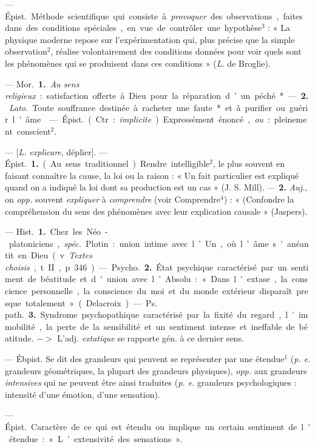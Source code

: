 \begin{itemize}[leftmargin=1cm, label=, itemsep=1pt]
 — \si{Épist.} Méthode
scientifique qui consiste à {\it provoquer}
des observations, faites dans des conditions spéciales, en vue de contrôler
une hypothèse$^3$ : « La physique
moderne repose sur l'expérimentation qui, plus précise que la
simple observation$^2$, réalise volontairement des conditions données
pour voir quels sont les phénomènes
qui se produisent dans ces conditions » ({\it L.} de Broglie).

 — \si{Mor.} {\bf 1.} {\it Au sens religieux} : satisfaction
offerte à Dieu pour la réparation d’un péché*.

— {\bf 2.} {\it Lato.} Toute souffrance destinée à racheter une faute* et à
purifier ou guérir l'âme.

 — \si{Épist.} (Ctr. : {\it implicite}).
Expressément énoncé, {\it ou} : pleinement conscient$^2$.

 — [{\it L.} {\it explicare}, déplier]. —
\si{Épist.} {\bf 1.} (Au sens traditionnel).
Rendre intelligible$^2$, le plus souvent
en faisant connaître la cause, la loi
ou la raison : « Un fait particulier est
expliqué quand on a indiqué la loi
dont sa production est un cas »
(J. S. Mill). — {\bf 2.} {\it Auj.}, on {\it opp.} souvent {\it expliquer}
à {\it comprendre} (voir Comprendre$^4$) : « (Confondre la
compréhension du sens des phénomènes avec leur explication causale »
(Jaspers).

 — \si{Hist.} {\bf 1.} Chez les Néo-platoniciens, {\it spéc.}
Plotin : union intime avec l’Un, où l'âme s'anéantit en
Dieu (v. {\it Textes choisis}, t. II, p. 346).
— \si{Psycho.} {\bf 2.} État psychique caractérisé par un sentiment
de béatitude et d'union avec l’Absolu : « Dans
l'extase, la conscience personnelle, la conscience du moi et du monde
extérieur disparaît presque totalement » (Delacroix). — \si{Ps. path.}
{\bf 3.} Syndrome psychopathique caractérisé par la fixité du regard, l’immobilité, la perte de la sensibilité et un sentiment intense et ineffable
de béatitude. $->$ L'adj. {\it extatique} se rapporte gén. à ce dernier sens.

 — Ébpist. Se dit des grandeurs qui peuvent se représenter par
une étendue$^1$ ({\it p. e.} grandeurs géométriques, la plupart des grandeurs
physiques), {\it opp.} aux grandeurs {\it intensives} qui ne peuvent être
ainsi traduites ({\it p. e.} grandeurs psychologiques : intensité d'une
émotion, d’une sensation).

 — \si{Épist.} Caractère de ce
qui est étendu ou implique un certain
sentiment de l'étendue : « L’extensivité des sensations ».


\end{itemize}
